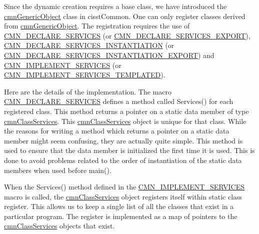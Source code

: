 Since the dynamic creation requires a base class, we have introduced the \hyperlink{classcmn_generic_object}{cmn\-Generic\-Object} class in cisst\-Common. One can only register classes derived from \hyperlink{classcmn_generic_object}{cmn\-Generic\-Object}. The registration requires the use of \hyperlink{cmn_class_register_macros_8h_a7fbab4cbcdfbf35062de4f734e697034}{C\-M\-N\-\_\-\-D\-E\-C\-L\-A\-R\-E\-\_\-\-S\-E\-R\-V\-I\-C\-E\-S} (or \hyperlink{cmn_class_register_macros_8h_a3dcd7732deee3f450741f0eb099ff778}{C\-M\-N\-\_\-\-D\-E\-C\-L\-A\-R\-E\-\_\-\-S\-E\-R\-V\-I\-C\-E\-S\-\_\-\-E\-X\-P\-O\-R\-T}), \hyperlink{mts_text_to_speech_8h_aae5c71840342a68c45d71caab531fec2}{C\-M\-N\-\_\-\-D\-E\-C\-L\-A\-R\-E\-\_\-\-S\-E\-R\-V\-I\-C\-E\-S\-\_\-\-I\-N\-S\-T\-A\-N\-T\-I\-A\-T\-I\-O\-N} (or \hyperlink{svl_filter_splitter_8h_ad1a0b59b6425e7aa5f3a61f12d7f0da2}{C\-M\-N\-\_\-\-D\-E\-C\-L\-A\-R\-E\-\_\-\-S\-E\-R\-V\-I\-C\-E\-S\-\_\-\-I\-N\-S\-T\-A\-N\-T\-I\-A\-T\-I\-O\-N\-\_\-\-E\-X\-P\-O\-R\-T}) and \hyperlink{cmn_class_register_macros_8h_a59997edde1868f5ce515ff85dfeaf2f8}{C\-M\-N\-\_\-\-I\-M\-P\-L\-E\-M\-E\-N\-T\-\_\-\-S\-E\-R\-V\-I\-C\-E\-S} (or \hyperlink{cmn_class_register_macros_8h_a6d3e8cb412f66ff7e73f3ab52290f471}{C\-M\-N\-\_\-\-I\-M\-P\-L\-E\-M\-E\-N\-T\-\_\-\-S\-E\-R\-V\-I\-C\-E\-S\-\_\-\-T\-E\-M\-P\-L\-A\-T\-E\-D}).

Here are the details of the implementation. The macro \hyperlink{cmn_class_register_macros_8h_a7fbab4cbcdfbf35062de4f734e697034}{C\-M\-N\-\_\-\-D\-E\-C\-L\-A\-R\-E\-\_\-\-S\-E\-R\-V\-I\-C\-E\-S} defines a method called Services() for each registered class. This method returns a pointer on a static data member of type \hyperlink{classcmn_class_services}{cmn\-Class\-Services}. This \hyperlink{classcmn_class_services}{cmn\-Class\-Services} object is unique for that class. While the reasons for writing a method which returns a pointer on a static data member might seem confusing, they are actually quite simple. This method is used to ensure that the data member is initialized the first time it is used. This is done to avoid problems related to the order of instantiation of the static data members when used before {\ttfamily main()}.

When the Services() method defined in the \hyperlink{cmn_class_register_macros_8h_a59997edde1868f5ce515ff85dfeaf2f8}{C\-M\-N\-\_\-\-I\-M\-P\-L\-E\-M\-E\-N\-T\-\_\-\-S\-E\-R\-V\-I\-C\-E\-S} macro is called, the \hyperlink{classcmn_class_services}{cmn\-Class\-Services} object registers itself within static class register. This allows us to keep a single list of all the classes that exist in a particular program. The register is implemented as a map of pointers to the \hyperlink{classcmn_class_services}{cmn\-Class\-Services} objects that exist.

